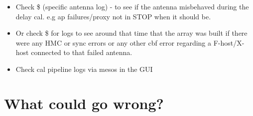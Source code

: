 \begin{itemize}
\item{} Check \$
(specific antenna log) - to see if the antenna misbehaved during the delay cal. e.g ap failures/proxy not in STOP when it should be.

\item{} Or check \$ for logs to see around that time that the array was built if there were any HMC or sync errors or any other cbf error regarding a F-host/X-host connected to that failed antenna.
\item{} Check cal pipeline logs via mesos in the GUI  

	
\end{itemize}

 

\section{ What could go wrong?}
